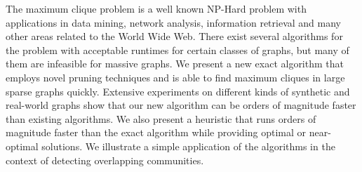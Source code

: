 The maximum clique problem is a well known NP-Hard problem with
applications in data mining, network analysis, information retrieval and many other
areas related to the World Wide Web.
There exist several algorithms for the problem with acceptable runtimes for
certain classes of graphs, but many of them are infeasible for massive graphs. 
We present a new exact algorithm that employs novel pruning techniques and 
is able to find maximum cliques in large sparse graphs quickly. 
Extensive experiments on different kinds of synthetic and 
real-world graphs show that our new algorithm can be orders of magnitude 
faster than existing algorithms.
We also present a heuristic that runs orders of magnitude faster than 
the exact algorithm while providing optimal or near-optimal solutions.
We illustrate a simple application of the algorithms in the context of 
detecting overlapping communities. 

